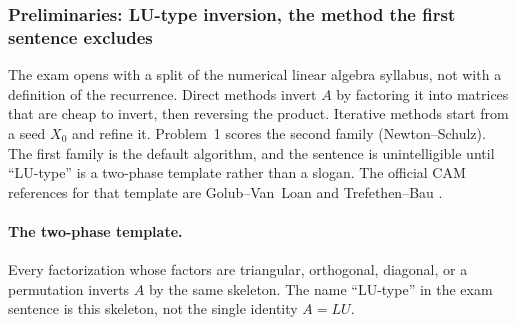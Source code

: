 \setcounter{section}{1}
\setcounter{theorem}{0}
\setcounter{definition}{0}
\setcounter{remark}{0}
\setcounter{note}{0}

\subsubsection{Preliminaries: LU-type inversion, the method the first sentence excludes}

The exam opens with a split of the numerical linear algebra syllabus, not with a definition of the recurrence. Direct methods invert \(A\) by factoring it into matrices that are cheap to invert, then reversing the product. Iterative methods start from a seed \(X_{0}\) and refine it. Problem~1 scores the second family (Newton--Schulz). The first family is the default algorithm, and the sentence is unintelligible until ``LU-type'' is a two-phase template rather than a slogan. The official CAM references for that template are Golub--Van~Loan \cite{golub96} and Trefethen--Bau \cite{trefethen97}.

\begin{center}
\end{center}

\paragraph{The two-phase template.}

Every factorization whose factors are triangular, orthogonal, diagonal, or a permutation inverts \(A\) by the same skeleton. The name ``LU-type'' in the exam sentence is this skeleton, not the single identity \(A=LU\).

